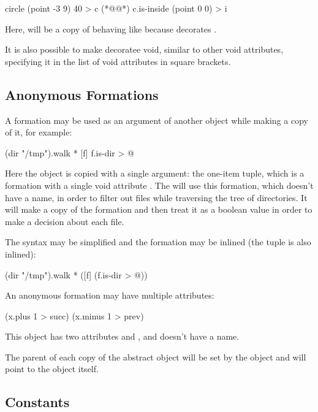\begin{ffcode}
circle (point -3 9) 40 > c  (*@\label{ln:circle-c}@*)
c.is-inside (point 0 0) > i
\end{ffcode}

Here,  will be a copy of  behaving like 
because  decorates .

It is also possible to make decoratee void, similar to other void
attributes, specifying it in the list of void attributes in
square brackets.

\subsection{Anonymous Formations}

A formation may be used as an argument of another object while
making a copy of it, for example:

\begin{ffcode}
(dir "/tmp").walk
  *
    [f]
      f.is-dir > @
\end{ffcode}

Here the object  is copied with a single argument:
the one-item tuple, which is a formation with a single void attribute . The 
will use this formation, which doesn't have a name, in order
to filter out files while traversing the tree of directories. It will
make a copy of the formation and then treat it as a boolean
value in order to make a decision about each file.

The syntax may be simplified and the formation may be inlined
(the tuple is also inlined):

\begin{ffcode}
(dir "/tmp").walk
  * ([f] (f.is-dir > @))
\end{ffcode}

An anonymous formation may have multiple attributes:

\begin{ffcode}
[x] (x.plus 1 > succ) (x.minus 1 > prev)
\end{ffcode}

This object has two attributes  and , and doesn't
have a name.

The parent of each copy of the abstract object will be set by
the object  and will point to the  object itself.

\subsection{Constants}

